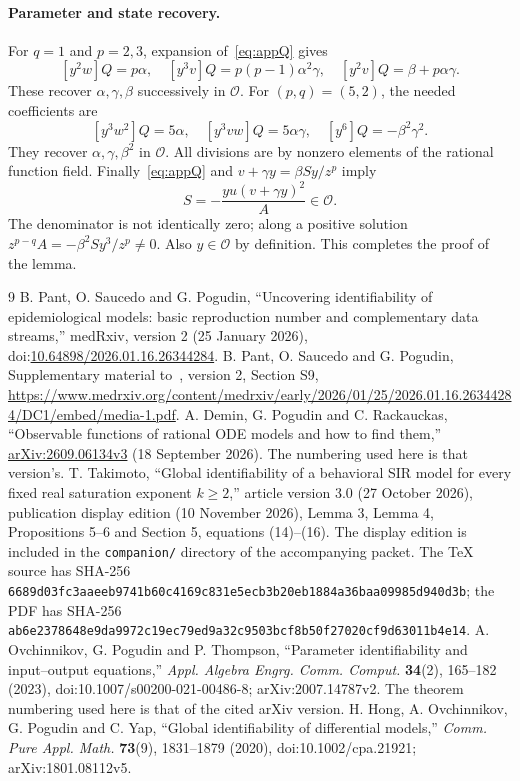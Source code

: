 \documentclass[10pt,a4paper]{article}
\begin{document}
\paragraph{Parameter and state recovery.}
For $q=1$ and $p=2,3$, expansion of~\eqref{eq:appQ} gives
\[
[y^2w]Q=p\alpha,\quad
[y^3v]Q=p(p-1)\alpha^2\gamma,\quad
[y^2v]Q=\beta+p\alpha\gamma.
\]
These recover $\alpha,\gamma,\beta$ successively in $\mathcal O$.
For $(p,q)=(5,2)$, the needed coefficients are
\[
[y^3w^2]Q=5\alpha,\quad
[y^3vw]Q=5\alpha\gamma,\quad
[y^6]Q=-\beta^2\gamma^2.
\]
They recover $\alpha,\gamma,\beta^2$ in $\mathcal O$.
All divisions are by nonzero elements of the rational function field.
Finally~\eqref{eq:appQ} and $v+\gamma y=\beta Sy/z^p$ imply
\begin{equation}
S=-\frac{yu(v+\gamma y)^2}{A}\in\mathcal O.
\label{eq:appS}
\end{equation}
The denominator is not identically zero; along a positive solution
$z^{p-q}A=-\beta^2Sy^3/z^p\ne0$. Also $y\in\mathcal O$ by
definition. This completes the proof of the lemma.

\clearpage
\begin{thebibliography}{9}
B. Pant, O. Saucedo and G. Pogudin,
``Uncovering identifiability of epidemiological models: basic reproduction
number and complementary data streams,'' medRxiv, version 2
(25 January 2026), doi:\href{https://doi.org/10.64898/2026.01.16.26344284}{10.64898/2026.01.16.26344284}.
B. Pant, O. Saucedo and G. Pogudin,
Supplementary material to~\cite{PSP}, version 2, Section S9,
\url{https://www.medrxiv.org/content/medrxiv/early/2026/01/25/2026.01.16.26344284/DC1/embed/media-1.pdf}.
A. Demin, G. Pogudin and C. Rackauckas,
``Observable functions of rational ODE models and how to find them,''
\href{https://arxiv.org/abs/2609.06134v3}{arXiv:2609.06134v3}
(18 September 2026). The numbering used here is that version's.
T. Takimoto,
``Global identifiability of a behavioral SIR model for every fixed real
saturation exponent $k\geq2$,'' article version 3.0
(27 October 2026), publication display edition (10 November 2026),
Lemma 3, Lemma 4, Propositions 5--6 and Section 5, equations (14)--(16).
The display edition is included in the \texttt{companion/} directory
of the accompanying packet. The TeX source has SHA-256
\texttt{6689d03fc3aaeeb9741b60c4169c831e5ecb3b20eb1884a36baa09985d940d3b};
the PDF has SHA-256
\texttt{ab6e2378648e9da9972c19ec79ed9a32c9503bcf8b50f27020cf9d63011b4e14}.
A. Ovchinnikov, G. Pogudin and P. Thompson,
``Parameter identifiability and input--output equations,''
\emph{Appl. Algebra Engrg. Comm. Comput.} \textbf{34}(2), 165--182 (2023),
doi:10.1007/s00200-021-00486-8; arXiv:2007.14787v2.
The theorem numbering used here is that of the cited arXiv version.
H. Hong, A. Ovchinnikov, G. Pogudin and C. Yap,
``Global identifiability of differential models,''
\emph{Comm. Pure Appl. Math.} \textbf{73}(9), 1831--1879 (2020),
doi:10.1002/cpa.21921; arXiv:1801.08112v5.
\end{thebibliography}
\end{document}
